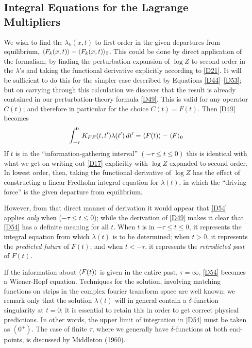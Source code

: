 \subsection*{Integral Equations for the Lagrange Multipliers}
We wish to find the $\lambda_k(x, t)$ to first order in the given departures from equilibrium, $\langle F_k(x, t)\rangle - \langle F_k(x, t)\rangle_0$.
This could be done by direct application of the formalism; by finding the perturbation expansion of $\log Z$ to second order in the $\lambda$'s and taking the functional derivative explicitly according to \eqref{D21}.
It will be sufficient to do this for the simpler case described by Equations \eqref{D44}--\eqref{D53}; but on carrying through this calculation we discover that the result is already contained in our perturbation-theory formula \eqref{D49}.
This is valid for any operator $C(t)$; and therefore in particular for the choice $C(t) = F(t)$.
Then \eqref{D49} becomes
\begin{equation}
	\label{D54}
	\int_{-\tau}^{0} K_{FF}(t, t') \lambda(t') \mathop{}\!d t' = \langle F(t)\rangle - \langle F\rangle_0
\end{equation}
If $t$ is in the ``information-gathering interval'' $(-\tau \leq t \leq 0)$ this is identical with what we get on writing out \eqref{D17} explicitly with $\log Z$ expanded to second order.
In lowest order, then, taking the functional derivative of $\log Z$ has the effect of constructing a linear Fredholm integral equation for $\lambda(t)$, in which the ``driving force'' is the given departure from equilibrium.

However, from that direct manner of derivation it would appear that \eqref{D54} applies \emph{only} when ($-\tau \leq t \leq 0)$; while the derivation of \eqref{D49} makes it clear that \eqref{D54} has a definite meaning for all $t$.
When $t$ is in $-\tau \leq t \leq 0$, it represents the integral equation from which $\lambda(t)$ is to be determined; when $t > 0$, it represents the \emph{predicted future} of $F(t)$; and when $t < -\tau$, it represents the \emph{retrodicted past} of $F(t)$.

If the information about $\langle F(t)\rangle$ is given in the entire past, $\tau = \infty$, \eqref{D54} becomes a Wiener-Hopf equation.
Techniques for the solution, involving matching functions on strips in the complex fourier transform space are well known; we remark only that the solution $\lambda(t)$ will in general contain a $\delta$-function singularity at $t = 0$; it is essential to retain this in order to get correct physical predictions.
In other words, the upper limit of integration in \eqref{D54} must be taken as $(0^+)$.
The case of finite $\tau$, where we generally have $\delta$-functions at both end-points, is discussed by Middleton (\cite{middleton}{1960}).

